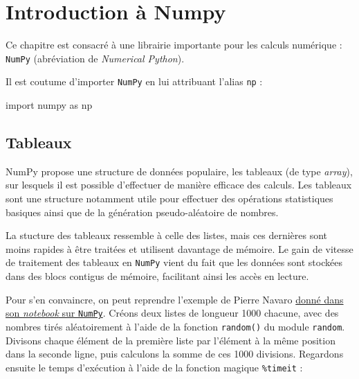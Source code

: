 \documentclass[12pt,]{book}
\newenvironment{Shaded}{\begin{snugshade}}{\end{snugshade}}
\newcommand{\KeywordTok}[1]{\textcolor[rgb]{0.13,0.29,0.53}{\textbf{#1}}}
\newcommand{\DecValTok}[1]{\textcolor[rgb]{0.00,0.00,0.81}{#1}}
\newcommand{\ImportTok}[1]{#1}
\newcommand{\CommentTok}[1]{\textcolor[rgb]{0.56,0.35,0.01}{\textit{#1}}}
\newcommand{\ControlFlowTok}[1]{\textcolor[rgb]{0.13,0.29,0.53}{\textbf{#1}}}
\newcommand{\OperatorTok}[1]{\textcolor[rgb]{0.81,0.36,0.00}{\textbf{#1}}}
\newcommand{\BuiltInTok}[1]{#1}
\newcommand{\NormalTok}[1]{#1}
\numberwithin{equation}{section}
\numberwithin{countremarque}{section}
\begin{document}
\chapter{Introduction à Numpy}\label{numpy}

Ce chapitre est consacré à une librairie importante pour les calculs
numérique : \texttt{NumPy} (abréviation de \emph{Numerical Python}).

Il est coutume d'importer \texttt{NumPy} en lui attribuant l'alias
\texttt{np} :

\begin{Shaded}
\begin{Highlighting}[]
\ImportTok{import}\NormalTok{ numpy }\ImportTok{as}\NormalTok{ np}
\end{Highlighting}
\end{Shaded}

\section{Tableaux}\label{numpy-tableaux}

NumPy propose une structure de données populaire, les tableaux (de type
\emph{array}), sur lesquels il est possible d'effectuer de manière
efficace des calculs. Les tableaux sont une structure notamment utile
pour effectuer des opérations statistiques basiques ainsi que de la
génération pseudo-aléatoire de nombres.

La stucture des tableaux ressemble à celle des listes, mais ces
dernières sont moins rapides à être traitées et utilisent davantage de
mémoire. Le gain de vitesse de traitement des tableaux en \texttt{NumPy}
vient du fait que les données sont stockées dans des blocs contigus de
mémoire, facilitant ainsi les accès en lecture.

Pour s'en convaincre, on peut reprendre l'exemple de Pierre Navaro
\href{https://github.com/pnavaro/python-notebooks/blob/master/13.Numpy.ipynb}{donné
dans son \emph{notebook} sur \texttt{NumPy}}. Créons deux listes de
longueur 1000 chacune, avec des nombres tirés aléatoirement à l'aide de
la fonction \texttt{random()} du module \texttt{random}. Divisons chaque
élément de la première liste par l'élément à la même position dans la
seconde ligne, puis calculons la somme de ces 1000 divisions. Regardons
ensuite le temps d'exécution à l'aide de la fonction magique
\texttt{\%timeit} :

\begin{Shaded}
\end{Shaded}
\end{document}
